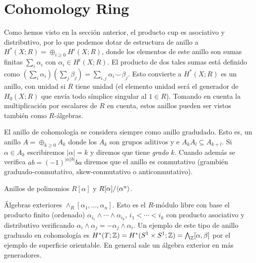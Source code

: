 \documentclass[TA.tex]{subfiles}
\begin{document}
\section{Cohomology Ring}
Como hemos visto en la sección anterior, el producto cup es asociativo y distributivo, por lo que podemos dotar de estructura de anillo a $H^*(X;R)=\oplus_{i\geq 0}H^i(X;R)$, donde los elementos de este anillo son sumas finitas $\sum_i\alpha_i$ con $\alpha_i\in H^i(X;R)$. El producto de dos tales sumas está definido como $(\sum_i\alpha_i)(\sum_j\beta_j)=\sum_{i,j}\alpha_i\smile\beta_j$. Esto convierte a $H^*(X;R)$ es un anillo, con unidad si $R$ tiene unidad (el elemento unidad será el generador de $H_0(X;R)$ que envía todo símplice singular al $1\in R$). Tomando en cuenta la multiplicación por escalares de $R$ en cuenta, estos anillos pueden ser vistos también como $R$-álgebras. 

El anillo de cohomología se considera siempre como anillo gradudado. Esto es, un anillo $A=\oplus_{k\geq 0}A_k$ donde los $A_k$ son grupos aditivos y e $A_k A_l\subseteq A_{k+l}$. Si $\alpha\in A_k$ escribiremos $|\alpha|=k$ y diremos que tiene \emph{grado} $k$. Cuando además se verifica $ab=(-1)^{|a||b|}ba$ diremos que el anillo es conmutativo (grambién graduado-conmutativo, skew-conmutativo o anticonmutativo).  

\begin{ej}
Anillos de polinomios $R[\alpha]$ y $R[\alpha]/\langle{\alpha^n}\rangle$. 
\end{ej}

\begin{ej}
Álgebras exteriores $\land_R[\alpha_1,\dots,\alpha_n]$. Esto es el $R$-módulo libre con base el producto finito (ordenado) $\alpha_{i_1}\land\cdots\land\alpha_{i_k}$, $i_1<\cdots<i_k$ con producto asociativo y distributivo verificando $\alpha_i\land\alpha_j=-\alpha_j\land\alpha_i$. Un ejemplo de este tipo de anillo graduado en cohomología es $H^*(T;\mathbb{Z})=H^*(S^1\times S^1;\mathbb{Z})=\bigwedge_{\mathbb{Z}}[\alpha,\beta]$ por el ejemplo de superficie orientable. En general sale un álgebra exterior en más generadores.  
\end{ej}
\end{document}
